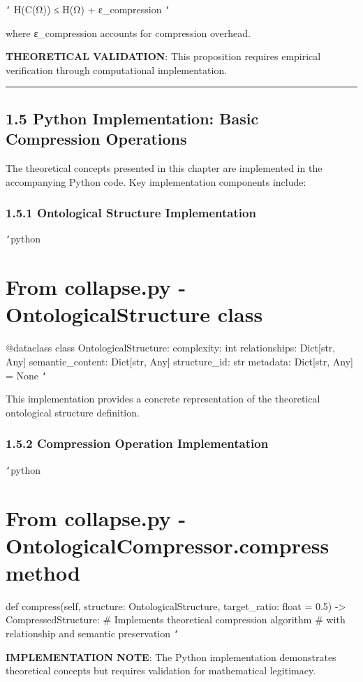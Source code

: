 \texttt{`}
H(C(Ω)) ≤ H(Ω) + ε_compression
\texttt{`}

where ε_compression accounts for compression overhead.

\textbf{THEORETICAL VALIDATION}: This proposition requires empirical verification through computational implementation.

\hrule

\section{1.5 Python Implementation: Basic Compression Operations}

The theoretical concepts presented in this chapter are implemented in the accompanying Python code. Key implementation components include:

\subsection{1.5.1 Ontological Structure Implementation}

\texttt{`}python
\chapter{From collapse.py - OntologicalStructure class}
@dataclass
class OntologicalStructure:
    complexity: int
    relationships: Dict[str, Any]
    semantic_content: Dict[str, Any]
    structure_id: str
    metadata: Dict[str, Any] = None
\texttt{`}

This implementation provides a concrete representation of the theoretical ontological structure definition.

\subsection{1.5.2 Compression Operation Implementation}

\texttt{`}python
\chapter{From collapse.py - OntologicalCompressor.compress method}
def compress(self, structure: OntologicalStructure, target_ratio: float = 0.5) -> CompressedStructure:
    \# Implements theoretical compression algorithm
    \# with relationship and semantic preservation
\texttt{`}

\textbf{IMPLEMENTATION NOTE}: The Python implementation demonstrates theoretical concepts but requires validation for mathematical legitimacy.


